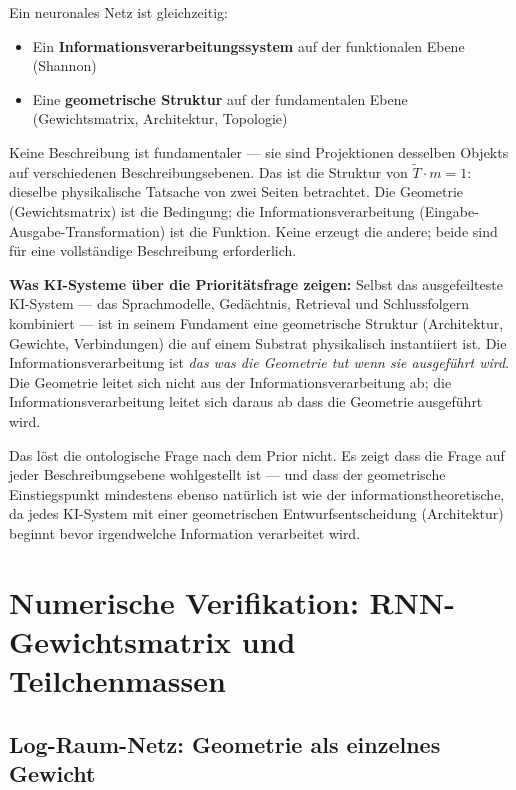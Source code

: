 Ein neuronales Netz ist gleichzeitig:
\begin{itemize}
  \item Ein \textbf{Informationsverarbeitungssystem} auf der
        funktionalen Ebene (Shannon)
  \item Eine \textbf{geometrische Struktur} auf der fundamentalen
        Ebene (Gewichtsmatrix, Architektur, Topologie)
\end{itemize}

Keine Beschreibung ist fundamentaler --- sie sind Projektionen
desselben Objekts auf verschiedenen Beschreibungsebenen. Das ist die
Struktur von $\tilde{T} \cdot m = 1$: dieselbe physikalische Tatsache
von zwei Seiten betrachtet. Die Geometrie (Gewichtsmatrix) ist die
Bedingung; die Informationsverarbeitung (Eingabe-Ausgabe-Transformation)
ist die Funktion. Keine erzeugt die andere; beide sind für eine
vollständige Beschreibung erforderlich.

\textbf{Was KI-Systeme über die Prioritätsfrage zeigen:} Selbst das
ausgefeilteste KI-System --- das Sprachmodelle, Gedächtnis, Retrieval
und Schlussfolgern kombiniert --- ist in seinem Fundament eine
geometrische Struktur (Architektur, Gewichte, Verbindungen) die auf
einem Substrat physikalisch instantiiert ist. Die Informationsverarbeitung
ist \emph{das was die Geometrie tut wenn sie ausgeführt wird}. Die
Geometrie leitet sich nicht aus der Informationsverarbeitung ab; die
Informationsverarbeitung leitet sich daraus ab dass die Geometrie
ausgeführt wird.

Das löst die ontologische Frage nach dem Prior nicht. Es zeigt dass
die Frage auf jeder Beschreibungsebene wohlgestellt ist --- und dass
der geometrische Einstiegspunkt mindestens ebenso natürlich ist wie
der informationstheoretische, da jedes KI-System mit einer
geometrischen Entwurfsentscheidung (Architektur) beginnt bevor
irgendwelche Information verarbeitet wird.


\section{Numerische Verifikation: RNN-Gewichts\-matrix und Teilchen\-massen}

\subsection{Log-Raum-Netz: Geometrie als einzelnes Gewicht}

